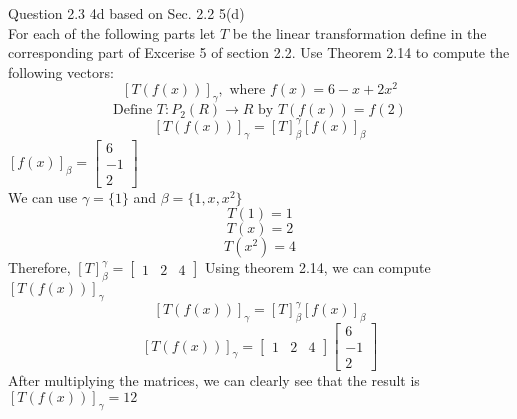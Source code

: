 \documentclass[answers,12pt,addpoints]{exam}
\begin{document}
\begin{questions}
\question Question 2.3 4d based on Sec. 2.2 5(d)\\
For each of the following parts let $T$ be the linear transformation define in the corresponding part of Excerise 5 of section 2.2. Use Theorem 2.14 to compute the following vectors:
$$[T(f(x))]_\gamma, \text{ where } f(x) = 6 - x + 2x^2$$
$$ \text{Define } T: P_2(R) \to R \text{ by } T(f(x)) = f(2)$$
$$[T(f(x))]_\gamma = [T]_\beta^\gamma[f(x)]_\beta$$
$[f(x)]_\beta = \begin{bmatrix} 6 \\ -1 \\ 2 \end{bmatrix}$\\
We can use $\gamma = \{1\}$ and $\beta = \{1, x, x^2\}$\\
$$T(1) = 1$$
$$T(x) = 2$$
$$T(x^2) = 4$$
Therefore, $[T]_\beta^\gamma = \begin{bmatrix} 1 & 2 & 4 \end{bmatrix}$
Using theorem 2.14, we can compute $[T(f(x))]_\gamma$\\
$$[T(f(x))]_\gamma = [T]_\beta^\gamma[f(x)]_\beta$$
$$[T(f(x))]_\gamma = \begin{bmatrix} 1 & 2 & 4 \end{bmatrix} \begin{bmatrix} 6 \\ -1 \\ 2 \end{bmatrix}$$
After multiplying the matrices, we can clearly see that the result is $[T(f(x))]_\gamma = 12$\\


\end{questions}
\end{document}
